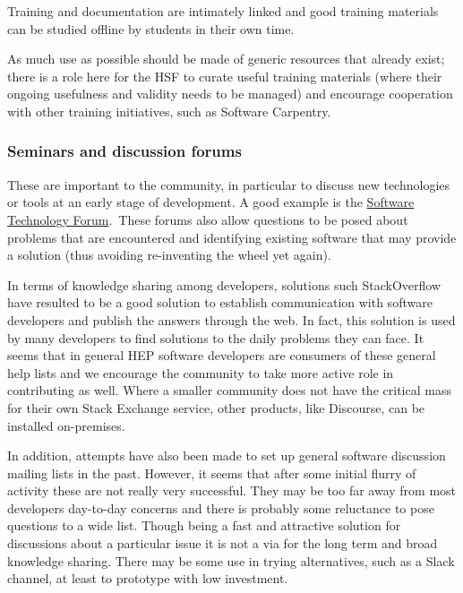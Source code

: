 \documentclass[12pt,a4paper]{article}
\begin{document}
Training and documentation are intimately linked and good training
materials can be studied offline by students in their own time.

As much use as possible should be made of generic resources that already
exist; there is a role here for the HSF to curate useful training
materials (where their ongoing usefulness and validity needs to be
managed) and encourage cooperation with other training initiatives, such
as Software Carpentry.

\hypertarget{seminars-and-discussion-forums}{%
\subsubsection{Seminars and discussion
forums}\label{seminars-and-discussion-forums}}

These are important to the community, in particular to discuss new
technologies or tools at an early stage of development. A good example
is the \href{https://indico.cern.ch/category/7857/}{{Software Technology
Forum}}.~These forums also allow questions to be posed about problems
that are encountered and identifying existing software that may provide
a solution (thus avoiding re-inventing the wheel yet again).

In terms of knowledge sharing among developers, solutions such
StackOverflow have resulted to be a good solution to establish
communication with software developers and publish the answers through
the web. In fact, this solution is used by many developers to find
solutions to the daily problems they can face. It seems that in general
HEP software developers are consumers of these general help lists and we
encourage the community to take more active role in contributing as
well. Where a smaller community does not have the critical mass for
their own Stack Exchange service, other products, like Discourse, can be
installed on-premises.

In addition, attempts have also been made to set up general software
discussion mailing lists in the past. However, it seems that after some
initial flurry of activity these are not really very successful. They
may be too far away from most developers day-to-day concerns and there
is probably some reluctance to pose questions to a wide list. Though
being a fast and attractive solution for discussions about a particular
issue it is not a via for the long term and broad knowledge sharing.
There may be some use in trying alternatives, such as a Slack channel,
at least to prototype with low investment.~
\end{document}
